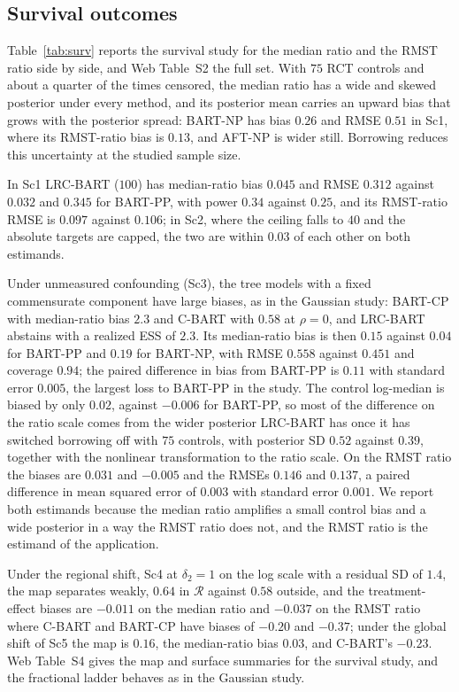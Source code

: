 \documentclass[11pt]{article}
\theoremstyle{definition}
\theoremstyle{plain}
\begin{document}
\subsection{Survival outcomes}
\label{sec:sim_surv}

Table~\ref{tab:surv} reports the survival study for the median ratio and the RMST ratio side by side, and Web Table~S2 the full set. With $75$ RCT controls and about a quarter of the times censored, the median ratio has a wide and skewed posterior under every method, and its posterior mean carries an upward bias that grows with the posterior spread: BART-NP has bias $0.26$ and RMSE $0.51$ in Sc1, where its RMST-ratio bias is $0.13$, and AFT-NP is wider still. Borrowing reduces this uncertainty at the studied sample size.

In Sc1 LRC-BART ($100$) has median-ratio bias $0.045$ and RMSE $0.312$ against $0.032$ and $0.345$ for BART-PP, with power $0.34$ against $0.25$, and its RMST-ratio RMSE is $0.097$ against $0.106$; in Sc2, where the ceiling falls to $40$ and the absolute targets are capped, the two are within $0.03$ of each other on both estimands.

Under unmeasured confounding (Sc3), the tree models with a fixed commensurate component have large biases, as in the Gaussian study: BART-CP with median-ratio bias $2.3$ and C-BART with $0.58$ at $\rho=0$, and LRC-BART abstains with a realized ESS of $2.3$. Its median-ratio bias is then $0.15$ against $0.04$ for BART-PP and $0.19$ for BART-NP, with RMSE $0.558$ against $0.451$ and coverage $0.94$; the paired difference in bias from BART-PP is $0.11$ with standard error $0.005$, the largest loss to BART-PP in the study. The control log-median is biased by only $0.02$, against $-0.006$ for BART-PP, so most of the difference on the ratio scale comes from the wider posterior LRC-BART has once it has switched borrowing off with $75$ controls, with posterior SD $0.52$ against $0.39$, together with the nonlinear transformation to the ratio scale. On the RMST ratio the biases are $0.031$ and $-0.005$ and the RMSEs $0.146$ and $0.137$, a paired difference in mean squared error of $0.003$ with standard error $0.001$. We report both estimands because the median ratio amplifies a small control bias and a wide posterior in a way the RMST ratio does not, and the RMST ratio is the estimand of the application.

Under the regional shift, Sc4 at $\delta_2=1$ on the log scale with a residual SD of $1.4$, the map separates weakly, $0.64$ in $\mathcal R$ against $0.58$ outside, and the treatment-effect biases are $-0.011$ on the median ratio and $-0.037$ on the RMST ratio where C-BART and BART-CP have biases of $-0.20$ and $-0.37$; under the global shift of Sc5 the map is $0.16$, the median-ratio bias $0.03$, and C-BART's $-0.23$. Web Table~S4 gives the map and surface summaries for the survival study, and the fractional ladder behaves as in the Gaussian study.
\end{document}
